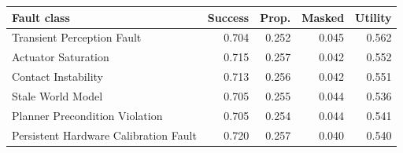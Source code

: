 \begin{tabular}{lrrrr}
\toprule
Fault class & Success & Prop. & Masked & Utility \\
\midrule
Transient Perception Fault & 0.704 & 0.252 & 0.045 & 0.562 \\
Actuator Saturation & 0.715 & 0.257 & 0.042 & 0.552 \\
Contact Instability & 0.713 & 0.256 & 0.042 & 0.551 \\
Stale World Model & 0.705 & 0.255 & 0.044 & 0.536 \\
Planner Precondition Violation & 0.705 & 0.254 & 0.044 & 0.541 \\
Persistent Hardware Calibration Fault & 0.720 & 0.257 & 0.040 & 0.540 \\
\bottomrule
\end{tabular}
